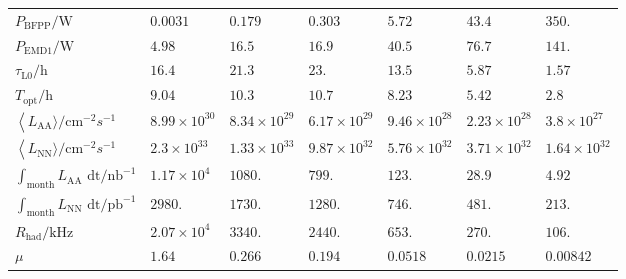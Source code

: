 \begin{tabular}{|*{1}{*{7}{|l}|}|}
$P_{\text{BFPP}}\text{/W}$                                                     &  \(0.0031\) & \(0.179\) & \(0.303\) & \(5.72\) & \(43.4\) & \(350.\) \\
$P_{\text{EMD1}}\text{/W}$                                                     &  \(4.98\) & \(16.5\) & \(16.9\) & \(40.5\) & \(76.7\) & \(141.\) \\
$\tau _{\text{L0}}\text{/h}$                                                   &  \(16.4\) & \(21.3\) & \(23.\) & \(13.5\) & \(5.87\) & \(1.57\) \\
$T_{\text{opt}}\text{/h}$                                                      &  \(9.04\) & \(10.3\) & \(10.7\) & \(8.23\) & \(5.42\) & \(2.8\) \\
$\left\langle L_{\text{AA}}\text{$\rangle $/}\text{cm}^{-2}s^{-1}\right.$      &  \(8.99\times 10^{30}\) & \(8.34\times 10^{29}\) & \(6.17\times 10^{29}\) & \(9.46\times 10^{28}\) & \(2.23\times 10^{28}\) & \(3.8\times 10^{27}\) \\
$\left\langle L_{\text{NN}}\text{$\rangle $/}\text{cm}^{-2}s^{-1}\right.$      &  \(2.3\times 10^{33}\) & \(1.33\times 10^{33}\) & \(9.87\times 10^{32}\) & \(5.76\times 10^{32}\) & \(3.71\times 10^{32}\) & \(1.64\times 10^{32}\) \\
$\int _{\text{month}}L_{\text{AA}}\text{ dt/}\text{nb}^{-1}$                   &  \(1.17\times 10^4\) & \(1080.\) & \(799.\) & \(123.\) & \(28.9\) & \(4.92\) \\
$\int _{\text{month}}L_{\text{NN}}\text{ dt/}\text{pb}^{-1}$                   &  \(2980.\) & \(1730.\) & \(1280.\) & \(746.\) & \(481.\) & \(213.\) \\
$R_{\text{had}}\text{/kHz}$                                                    &  \(2.07\times 10^4\) & \(3340.\) & \(2440.\) & \(653.\) & \(270.\) & \(106.\) \\
$\mu$                                                                          &  \(1.64\) & \(0.266\) & \(0.194\) & \(0.0518\) & \(0.0215\) & \(0.00842\) \\
\end{tabular}
